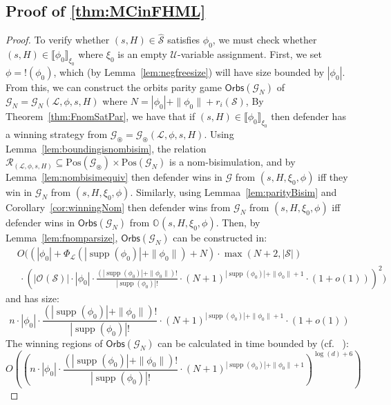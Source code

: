 \documentclass[10pt,a4paper]{article}
\theoremstyle{definition}
\theoremstyle{remark}
\newcommand\pos[0]{\mathrm{Pos}}
\newcommand\regindex[0]{r_i}
\DeclareMathOperator{\supp}{supp}
\newcommand\sem[2][\xi]{\llbracket#2\rrbracket_{#1}}
\newcommand\Gcal{\mathcal{G}}
\newcommand\Lcal{\mathcal{L}}
\newcommand\Rcal{\mathcal{R}}
\newcommand\Scal{\mathcal{S}}
\newcommand\Ucal{\mathcal{U}}
\newcommand\orb[1][]{\mathcal{O}_{#1}}
\newcommand\orbs[1][]{\mathbb{O}_{#1}}
\renewcommand\S{N}
\newcommand\fgame[0]{\Gcal_\circledast}
\newcommand\fstates[0]{\hat{\Scal}}
\newcommand\gorb[0]{{\mathsf{Orbs}}}
\begin{document}
\subsection{Proof of \cref{thm:MCinFHML}}
\MCinFHML*
  \begin{proof}
To verify whether $(s, H) \in \fstates$ satisfies $\phi_0$, we must check whether $(s, H) \in \sem[\xi_0]{\phi_0}$ where $\xi_0$ is an empty $\Ucal$-variable assignment. 
First, we set $\phi = !(\phi_0)$, which (by Lemma~\ref{lem:negfreesize}) will have size bounded by $|\phi_0|$. 
From this, we can construct the orbits parity game $\gorb(\Gcal_\S)$ of $\Gcal_\S = \Gcal_\S(\Lcal, \phi, s, H)$ where $\S = |\phi_0| + \|\phi_0\| + \regindex(\Scal)$, 
By Theorem~\ref{thm:FnomSatPar}, we have that if $(s, H) \in \sem[\xi_0]{\phi_0}$ then defender has a winning strategy from $\fgame = \fgame(\Lcal, \phi, s, H)$.
Using Lemma~\ref{lem:boundingisnombisim}, the relation $\Rcal_{(\Lcal, \phi, s, H)} \subseteq \pos(\fgame) \times \pos(\Gcal_\S)$ is a nom-bisimulation, 
and by Lemma~\ref{lem:nombisimequiv} then defender wins in $\Gcal$ from $(s, H, \xi_0, \phi)$ iff they win in $\Gcal_\S$ from $(s, H, \xi_0, \phi)$.
Similarly, using Lemmaa~\ref{lem:parityBisim} and Corollary~\ref{cor:winningNom} then defender wins from $\Gcal_\S$ from $(s, H, \xi_0, \phi)$ iff defender wins in $\gorb(\Gcal_\S)$ from $\orbs(s, H, \xi_0, \phi)$. 
Then, by Lemma~\ref{lem:fnomparsize}, $\gorb(\Gcal_\S)$ can be constructed in:
    \begin{align*}
	&O(
	(|\phi_0| + \Phi_\Lcal(|\supp(\phi_0)| + \|\phi_0\|) + \S)
	\cdot
	\max(N + 2, |\Scal|
	) \\&\ \cdot 
	(|\orb(\Scal)| \cdot|\phi_0|\cdot \frac{(|\supp(\phi_0)|+\|\phi_0\|)!}{|\supp(\phi_0)|!}\cdot (\S + 1)^{|\supp(\phi_0)| + \|\phi_0\| + 1}\cdot(1+o(1)))
	^2)
\end{align*}
and has size:
\[
n \cdot|\phi_0|\cdot \frac{(|\supp(\phi_0)|+\|\phi_0\|)!}{|\supp(\phi_0)|!}\cdot (\S + 1)^{|\supp(\phi_0)| + \|\phi_0\| + 1}\cdot(1+o(1))
\]
The winning regions of $\gorb(\Gcal_\S)$ can be calculated in time bounded by (cf.
~\cite{CaludeJKLS22}):
\[
O((n \cdot|\phi_0|\cdot \frac{(|\supp(\phi_0)| + \|\phi_0\|)!}{|\supp(\phi_0)|!}\cdot (\S + 1)^{|\supp(\phi_0)| + \|\phi_0\| + 1})^{\log(d) + 6})
\]


\end{proof}
\end{document}
